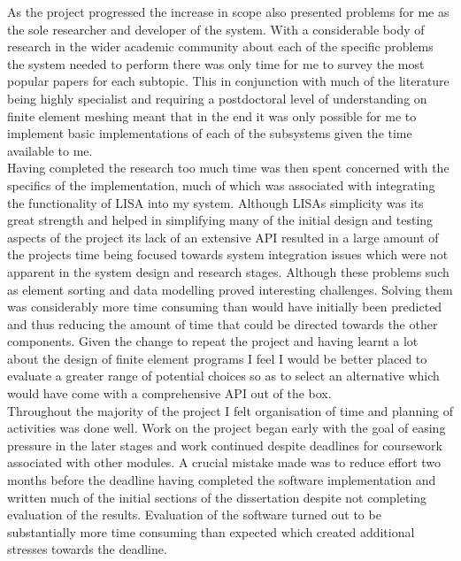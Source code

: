 \noindent
As the project progressed the increase in scope also presented problems for me as the sole researcher and developer of the system. With a considerable body of research in the wider academic community about each of the specific problems the system needed to perform there was only time for me to survey the most popular papers for each subtopic. This in conjunction with much of the literature being highly specialist and requiring a postdoctoral level of understanding on finite element meshing meant that in the end it was only possible for me to implement basic implementations of each of the subsystems given the time available to me. \\ 

  
\noindent
Having completed the research too much time was then spent concerned with the specifics of the implementation, much of which was associated with integrating the functionality of LISA into my system. Although LISAs simplicity was its great strength and helped in simplifying many of the initial design and testing aspects of the project its lack of an extensive API resulted in a large amount of the projects time being focused towards system integration issues which were not apparent in the system design and research stages. Although these problems such as element sorting and data modelling proved interesting challenges. Solving them was considerably more time consuming than would have initially been predicted and thus reducing the amount of time that could be directed towards the other components. Given the change to repeat the project and having learnt a lot about the design of finite element programs I feel I would be better placed to evaluate a greater range of potential choices so as to select an alternative which would have come with a comprehensive API out of the box. \\ 

\noindent
Throughout the majority of the project I felt organisation of time and planning of activities was done well. Work on the project began early with the goal of easing pressure in the later stages and work continued despite deadlines for coursework associated with other modules. A crucial mistake made was to reduce effort two months before the deadline having completed the software implementation and written much of the initial sections of the dissertation despite not completing evaluation of the results. Evaluation of the software turned out to be substantially more time consuming than expected which created additional stresses towards the deadline. \\

